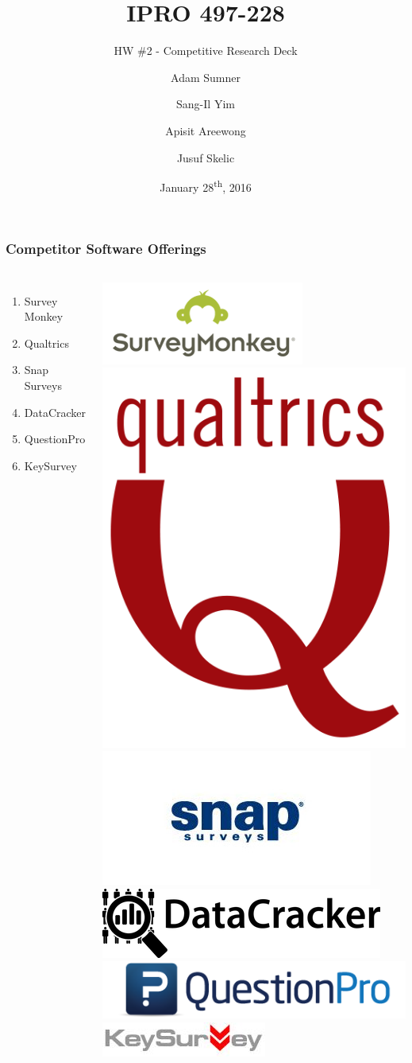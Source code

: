 \documentclass{beamer}
\title[IPRO 497-228]{IPRO 497-228}
\subtitle{HW \#2 - Competitive Research Deck}
\author[]{Adam Sumner \and Sang-Il Yim\and Apisit Areewong \and Jusuf Skelic}
\institute[Illinois Tech]{Illinois Institute of Technology}
\date{January 28\textsuperscript{th}, 2016}
\begin{document}
	\frame{\titlepage}
	
	\begin{frame}
		\frametitle{Competitor Software Offerings}
		\begin{columns}
			\begin{enumerate}
				\item Survey Monkey
				\item Qualtrics
				\item Snap Surveys
				\item DataCracker
				\item QuestionPro
				\item KeySurvey
			\end{enumerate}
			
			\includegraphics[width=0.5\linewidth]{surveymonkey_logo}
			\includegraphics[width=0.2\linewidth]{qualtrics_logo} \\
			\includegraphics[width=0.5\linewidth]{snapsurvey_logo}
			\includegraphics[width=0.4\linewidth]{datacracker_logo} \\
			\includegraphics[width=0.5\linewidth]{question_pro}
			\includegraphics[width=0.5\linewidth]{Key_Survey_Logo}
		\end{columns}
	\end{frame}
	
\end{document}
